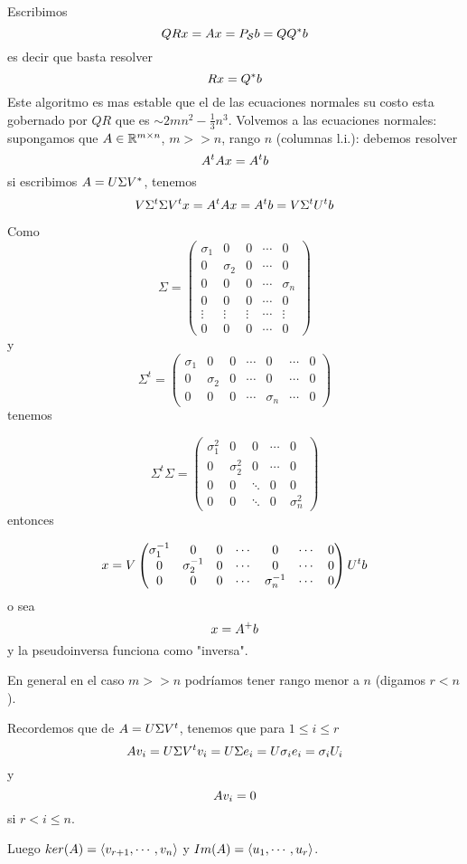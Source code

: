 Escribimos
$$
\Qb\Rb\xb=\Ab\xb=P_{\mathcal{S}}\bb=\Qb\Qb^*\bb
$$
es decir que basta resolver
$$
\Rb\xb=\Qb^*\bb
$$
Este algoritmo es mas estable que el de las ecuaciones normales su costo esta gobernado por $QR$  que es
$\sim 2mn^2-\frac13n^3$.
Volvemos a las ecuaciones normales: supongamos que $\Ab\in \R^{m\times n}$, $m>>n$, rango $n$  (columnas l.i.): debemos resolver
$$
\Ab^t\Ab\xb=\Ab^t\bb
$$
si escribimos $\Ab=\Ub\Sigma\Vb^*$, tenemos
$$
\Vb\Sigma^t\Sigma\Vb^t\xb=\Ab^t\Ab\xb=\Ab^t\bb=\Vb\Sigma^t\Ub^t\bb
$$

Como
$$\Sigma=
\begin{pmatrix}
\sigma_1&0&0&\cdots &0\\
0&\sigma_2&0&\cdots &0\\
0&0&0&\cdots&\sigma_n\\
0&0&0&\cdots&0\\
\vdots&\vdots&\vdots&\cdots&\vdots\\
0&0&0&\cdots&0
\end{pmatrix}
$$
y
$$\Sigma^t=
\begin{pmatrix}
\sigma_1&0&0&\cdots &0&\cdots&0\\
0&\sigma_2&0&\cdots &0&\cdots&0\\
0&0&0&\cdots&\sigma_n&\cdots&0
\end{pmatrix}
$$
tenemos

$$
\Sigma^t\Sigma=
\begin{pmatrix}
\sigma_1^2&0&0&\cdots &0\\
0&\sigma_2^2&0&\cdots &0\\
0&0&\ddots&0&0\\
0&0&\ddots&0&\sigma_n^2
\end{pmatrix}
$$
entonces

$$
\xb=
\Vb
\begin{pmatrix}
\sigma_1^{-1}&0&0&\cdots &0&\cdots&0\\
0&\sigma_2^{-1}&0&\cdots &0&\cdots&0\\
0&0&0&\cdots&\sigma_n^{-1}&\cdots&0
\end{pmatrix}
\Ub^t\bb
$$
o sea
$$
\xb=
\Ab^+\bb
$$
y la pseudoinversa funciona como "inversa".

En general en el caso $m>>n$ podríamos tener rango menor a $n$ (digamos $r<n$).

Recordemos que de $\Ab=\Ub\Sigma\Vb^t$, tenemos que para $1\le i\le r$
$$
\Ab\vb_i=\Ub\Sigma\Vb^t\vb_i=\Ub\Sigma\eb_i=\Ub\sigma_i\eb_i=\sigma_i\Ub_i
$$
y
$$
\Ab\vb_i=\cero
$$
si $r<i\le n$.


Luego $ker(\Ab)=\langle \vb_{r+1},\cdots,\vb_n\rangle $ y
$Im(\Ab)=\langle \ub_1,\cdots,\ub_r\rangle$.

